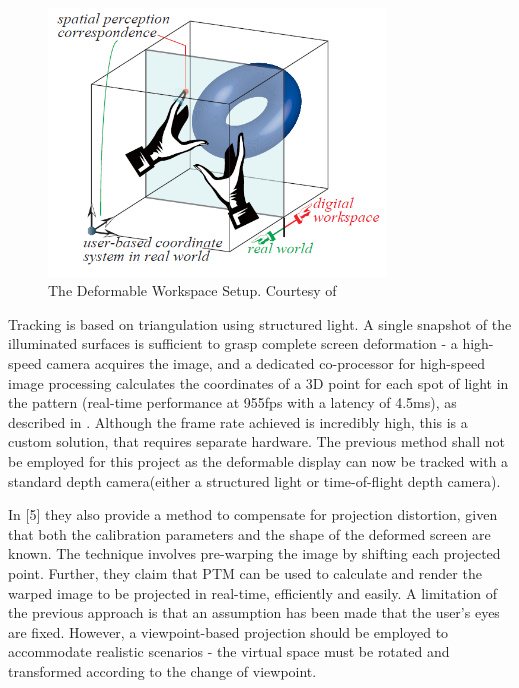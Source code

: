 \documentclass[]{article}
\begin{document}
\begin{figure}[hbtp]
    \centering
    \includegraphics[width=0.8\textwidth]{figures/TheDeformableWorkspace.PNG}
    \caption{The Deformable Workspace Setup. Courtesy of \cite{watanabe08}}
    \label{fig:deformable_workspace}
\end{figure}

Tracking is based on triangulation using structured light. A single snapshot of the illuminated surfaces is sufficient to grasp complete screen deformation - a high-speed camera acquires the image, and a dedicated co-processor for high-speed image processing calculates the coordinates of a 3D point for each spot of light in the pattern (real-time performance at 955fps with a latency of 4.5ms), as described in \cite{watanabe07}. Although the frame rate achieved is incredibly high, this is a custom solution, that requires separate hardware. The previous method shall not be employed for this project as the deformable display can now be tracked with a standard depth camera(either a structured light or time-of-flight depth camera).

In [5] they also provide a method to compensate for projection distortion, given that both the calibration parameters and the shape of the deformed screen are known. The technique involves pre-warping the image by shifting each projected point. Further, they claim that PTM can be used to calculate and render the warped image to be projected in real-time, efficiently and easily. A limitation of the previous approach is that an assumption has been made that the user’s eyes are fixed. However, a viewpoint-based projection should be employed to accommodate realistic scenarios - the virtual space must be rotated and transformed according to the change of viewpoint.\\
\end{document}
